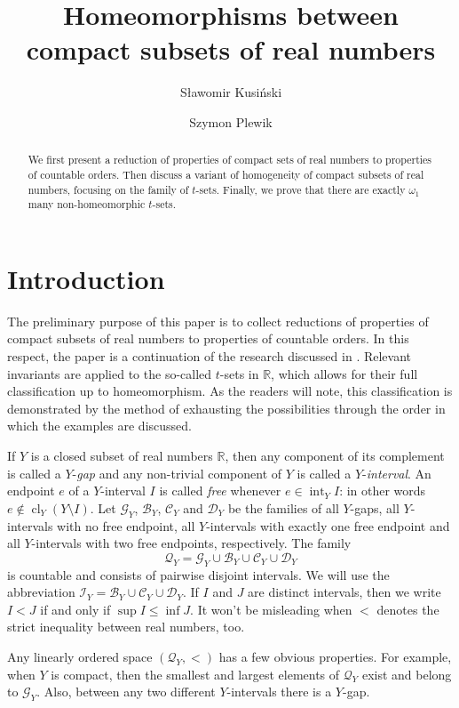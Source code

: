 \documentclass[12pt,a4paper,leqno]{amsart}
\title{Homeomorphisms between compact subsets of   real numbers}
\author{Sławomir Kusiński}
\author{Szymon Plewik}
\newcommand{\calG}{\mathcal{G}}
\newcommand{\cl}{\operatorname{cl}}
\renewcommand{\int}{\operatorname{int}}
\theoremstyle{definition}
\begin{document}
  \begin{abstract} We first present  a reduction of properties  of  compact sets of real  numbers to properties of countable orders. Then discuss  a variant of homogeneity  of compact subsets of  real numbers, focusing on the family of  $t$-sets. Finally, we prove that there are exactly $\omega_1$ many non-homeomorphic $t$-sets. \end{abstract}

  \maketitle
  \section{Introduction}
	The preliminary purpose of this paper is to collect  reductions of properties of  compact subsets of real  numbers to properties of countable orders. In this respect, the  paper is a continuation of the research discussed in  \cite{bkp}. Relevant invariants are applied to the so-called $t$-sets in $\mathbb R$, which allows for their full classification up to homeomorphism. As the readers will note, this classification is demonstrated by the method of exhausting the possibilities through the order in which the examples are discussed.

 If $Y$ is a  closed subset of real  numbers $\mathbb{R}$, then any   component of its complement  is called  a $Y$-\textit{gap} and any non-trivial component of $Y$ is  called a $Y$-\textit{interval}. An endpoint $e$ of a $Y$-interval $I$ is called \textit{free} whenever 
$e \in \int_Y I$: in other words $e\notin \cl_Y(Y\setminus I)$. Let $\calG_Y$, $\mathcal B_Y$, $\mathcal C_Y$ and $\mathcal D_Y$ be the families of all $Y$-gaps,  all $Y$-intervals with no free endpoint, all $Y$-intervals with  exactly one free endpoint and all $Y$-intervals with two free endpoints, respectively. 
The family $$\mathcal Q_Y= \mathcal G_Y\cup\mathcal B_Y\cup \mathcal C_Y\cup \mathcal D_Y $$ is countable and consists of pairwise disjoint intervals. We will use the abbreviation $\mathcal I_Y=\mathcal B_Y\cup \mathcal C_Y\cup \mathcal D_Y $. If $I$ and $J$ are distinct intervals, then   we  write $I < J$ if and only if $\sup I \leqslant \inf J$. It won't be misleading when $<$  
  denotes the strict inequality between real numbers, too. 
	
Any linearly ordered space $(\mathcal Q_Y, <)$ has a few obvious properties. For example, when $Y$ is compact, then the smallest and largest elements of $\mathcal Q_Y$ exist and belong to $\mathcal G_Y$. Also, between any two different  $Y$-intervals there is  a $Y$-gap. 
\end{document}
